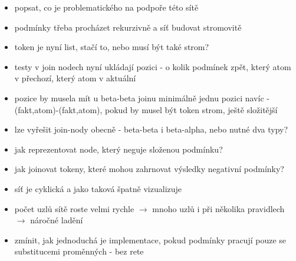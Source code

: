 \begin{framed}
  \begin{itemize}
    \item popsat, co je problematického na podpoře této sítě
    \item podmínky třeba procházet rekurzivně a síť budovat stromovitě
    \item token je nyní list, stačí to, nebo musí být také strom?
    \item testy v join nodech nyní ukládají pozici - o kolik podmínek zpět,
      který atom v přechozí, který atom v aktuální
    \item pozice by musela mít u beta-beta joinu minimálně jednu pozici navíc -
      (fakt,atom)-(fakt,atom), pokud by musel být token strom, ještě složitější
    \item lze vyřešit join-nody obecně - beta-beta i beta-alpha, nebo nutné dva
      typy?
    \item jak reprezentovat node, který neguje složenou podmínku?
    \item jak joinovat tokeny, které mohou zahrnovat výsledky negativní podmínky?
    \item síť je cyklická a jako taková špatně vizualizuje
    \item počet uzlů sítě roste velmi rychle $\rightarrow$ mnoho uzlů i při
      několika pravidlech $\rightarrow$ náročné ladění
    \item zmínit, jak jednoduchá je implementace, pokud podmínky pracují pouze
      se substitucemi proměnných - bez rete
  \end{itemize}
\end{framed}
